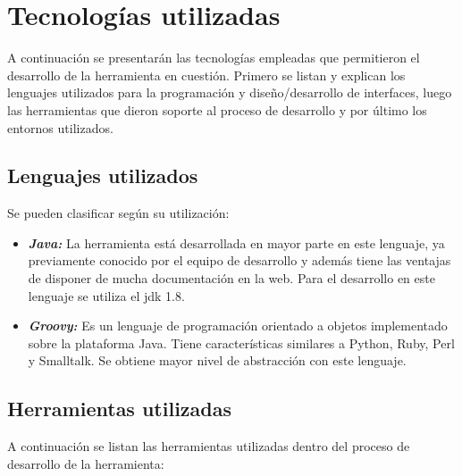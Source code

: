 \chapter{Tecnologías utilizadas}

A continuación se presentarán las tecnologías empleadas que permitieron el desarrollo de la herramienta en cuestión. Primero se listan y explican los lenguajes utilizados para la programación y diseño/desarrollo de interfaces, luego las herramientas que dieron soporte al proceso de desarrollo y por último los  entornos  utilizados. 

\section{Lenguajes utilizados}
Se pueden clasificar según su utilización:

\begin{itemize}
	\item \emph{\textbf{Java:}} La herramienta está desarrollada en mayor parte en este lenguaje, ya previamente conocido por el equipo de desarrollo y además tiene las ventajas de disponer de mucha documentación en la web. Para el desarrollo en este lenguaje se  utiliza  el  jdk  1.8. \cite{java} \\
 	\item \emph{\textbf{Groovy:}} Es un lenguaje de programación orientado a objetos implementado sobre la plataforma Java. Tiene características similares a Python, Ruby, Perl y Smalltalk. Se obtiene mayor nivel de abstracción con este lenguaje. \cite{groovy}
\end{itemize}

\section{Herramientas utilizadas}
A continuación se listan las herramientas utilizadas dentro del proceso de   desarrollo  de  la  herramienta: \\

